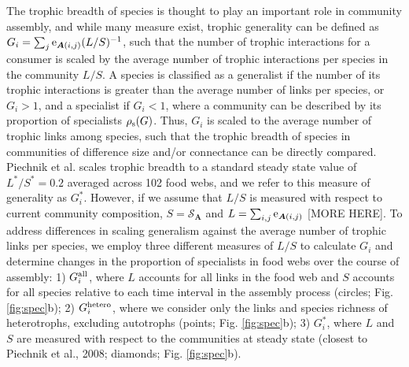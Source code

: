 \documentclass[twocolumn,preprintnumbers,amsmath,amssymb,superscriptaddress]{revtex4}
\newcommand{\rr}[1]{{\rm #1}}
\begin{document}
The trophic breadth of species is thought to play an important role in community assembly, and while many measure exist, trophic generality can be defined as $G_i = \sum_j \rr{e}_{{\bm A}(i,j)}(L/S)^{-1}$, such that the number of trophic interactions for a consumer is scaled by the average number of trophic interactions per species in the community $L/S$.
A species is classified as a generalist if the number of its trophic interactions is greater than the average number of links per species, or $G_i > 1$, and a specialist if $G_i < 1$, where a community can be described by its proportion of specialists $\rho_\rr{s}(G)$.
Thus, $G_i$ is scaled to the average number of trophic links among species, such that the trophic breadth of species in communities of difference size and/or connectance can be directly compared.
Piechnik et al. scales trophic breadth to a standard steady state value of $L^*/S^* = 0.2$ averaged across 102 food webs, and we refer to this measure of generality as $G_i^*$.
However, if we assume that $L/S$ is measured with respect to current community composition, $S = \mathcal{S}_{\bm A}$ and $L=\sum_{i,j} \rr{e}_{{\bm A}(i,j)}$ [MORE HERE].
To address differences in scaling generalism against the average number of trophic links per species, we employ three different measures of $L/S$ to calculate $G_i$ and determine changes in the proportion of specialists in food webs over the course of assembly:
1) $G_i^{\rr{all}}$, where $L$ accounts for all links in the food web and $S$ accounts for all species relative to each time interval in the assembly process (circles; Fig. \ref{fig:spec}b);
2) $G_i^{\rr{hetero}}$, where we consider only the links and species richness of heterotrophs, excluding autotrophs (points; Fig. \ref{fig:spec}b);
3) $G_i^*$, where $L$ and $S$ are measured with respect to the communities at steady state (closest to Piechnik et al., 2008; diamonds; Fig. \ref{fig:spec}b).
\end{document}
